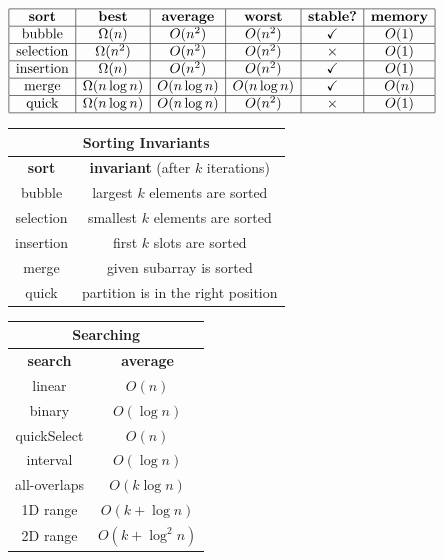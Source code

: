 \documentclass[10pt, landscape]{article}
\newenvironment{tightcenter}{%
  \setlength\topsep{0pt}
  \setlength\parskip{0pt}
  \begin{center}
}{%
  \end{center}
}
\begin{document}
\begin{multicols}{2}

    \begin{tightcenter}
        $
        \begin{array}{| c | c | c | c | c | c |}
            \hline\textbf{sort} & \textbf{best} & \textbf{average} & \textbf{worst} & \textbf{stable?} & \textbf{memory}
    
            \\\hline\text{bubble} & \Omega(n) & O(n^2) & O(n^2) & \checkmark & O(1)
            
            \\\hline\text{selection} & \Omega(n^2) & O(n^2) & O(n^2) & \times & O(1)
            
            \\\hline\text{insertion} & \Omega(n) & O(n^2) & O(n^2) & \checkmark & O(1)
            
            \\\hline\text{merge} & \Omega(n\log n) & O(n\log n) & O(n\log n) & \checkmark & O(n)
            
            \\\hline\text{quick} & \Omega(n\log n) & O(n\log n) & O(n^2) & \times & O(1)
            \\\hline
        \end{array} 
        $\
        \begin{tabular}{| c | c |}
            \multicolumn{2}{c}{Sorting Invariants}
            \\\hline\textbf{sort} & \textbf{invariant} (after $k$ iterations)
            \\\hline bubble & largest $k$ elements are sorted
            \\\hline selection & smallest $k$ elements are sorted
            \\\hline insertion & first $k$ slots are sorted
            \\\hline merge & given subarray is sorted
            \\\hline quick & partition is in the right position
            \\\hline
        \end{tabular} \begin{tabular}{| c | c |}
            \multicolumn{2}{c}{Searching}\\\hline
            \textbf{search} & \textbf{average} \\\hline
            linear & $O(n)$ \\\hline
            binary & $O(\log n)$ \\\hline
            quickSelect & $O(n)$ \\\hline
            interval & $O(\log n)$ \\\hline
            all-overlaps & $O(k\log n)$ \\\hline
            1D range & $O(k + \log n)$ \\\hline
            2D range & $O(k + \log^2 n)$ \\\hline
        \end{tabular}


\end{tightcenter}
\end{multicols}
\end{document}
